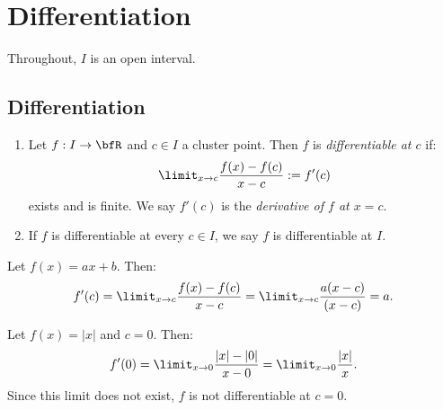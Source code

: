 \chapter{Differentiation}
Throughout, $I$ is an open interval.
\section{Differentiation}

    \begin{definition}
        \phantom{a}
        \begin{enumerate}[label = (\arabic*)]
            \item Let $f:I \rightarrow \bfR$ and $c \in I$ a cluster point. Then $f$ is \textit{differentiable at $c$} if:
            \begin{equation*}
            \begin{split}
                \limit_{x \rightarrow c} \frac{f(x)-f(c)}{x-c} := f'(c)
            \end{split}
            \end{equation*}
        exists and is finite. We say $f'(c)$ is the \textit{derivative of $f$ at $x = c$}.

            \item If $f$ is differentiable at every $c \in I$, we say $f$ is differentiable at $I$.
        \end{enumerate}
    \end{definition}

    \begin{example}
        Let $f(x) = ax + b$. Then:
            \begin{equation*}
            \begin{split}
                f'(c) = \limit_{x \rightarrow c} \frac{f(x) - f(c)}{x-c} = \limit_{x \rightarrow c}\frac{a(x-c)}{(x-c)} = a.
            \end{split}
            \end{equation*}
    \end{example}

    \begin{example}
        Let $f(x) = |x|$ and $c = 0$. Then:
            \begin{equation*}
            \begin{split}
                f'(0) = \limit_{x \rightarrow 0}\frac{|x| - |0|}{x-0} = \limit_{x \rightarrow 0}\frac{|x|}{x}.
            \end{split}
            \end{equation*}
        Since this limit does not exist, $f$ is not differentiable at $c = 0$.
    \end{example}


